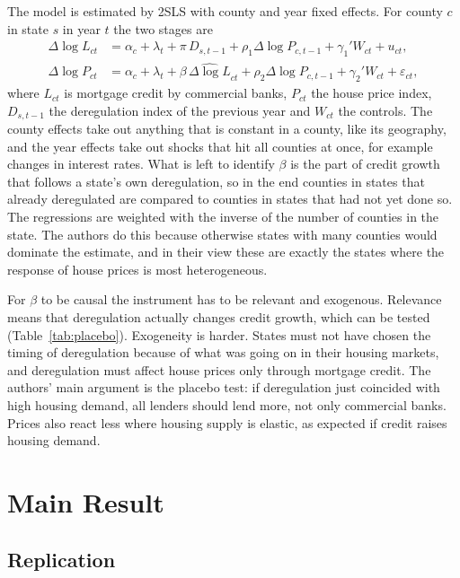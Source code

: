 \documentclass[12pt,a4paper]{article}
\begin{document}
The model is estimated by 2SLS with county and year fixed effects. For county $c$ in state $s$ in year $t$ the two stages are
\begin{align}
  \Delta \log L_{ct} &= \alpha_c + \lambda_t + \pi\, D_{s,t-1} + \rho_1 \Delta \log P_{c,t-1} + \gamma_1' W_{ct} + u_{ct}, \label{eq:fs}\\
  \Delta \log P_{ct} &= \alpha_c + \lambda_t + \beta\, \widehat{\Delta \log L}_{ct} + \rho_2 \Delta \log P_{c,t-1} + \gamma_2' W_{ct} + \varepsilon_{ct}, \label{eq:main}
\end{align}
where $L_{ct}$ is mortgage credit by commercial banks, $P_{ct}$ the house price index, $D_{s,t-1}$ the deregulation index of the previous year and $W_{ct}$ the controls. The county effects take out anything that is constant in a county, like its geography, and the year effects take out shocks that hit all counties at once, for example changes in interest rates. What is left to identify $\beta$ is the part of credit growth that follows a state's own deregulation, so in the end counties in states that already deregulated are compared to counties in states that had not yet done so. The regressions are weighted with the inverse of the number of counties in the state. The authors do this because otherwise states with many counties would dominate the estimate, and in their view these are exactly the states where the response of house prices is most heterogeneous.

For $\beta$ to be causal the instrument has to be relevant and exogenous. Relevance means that deregulation actually changes credit growth, which can be tested (Table~\ref{tab:placebo}). Exogeneity is harder. States must not have chosen the timing of deregulation because of what was going on in their housing markets, and deregulation must affect house prices only through mortgage credit. The authors' main argument is the placebo test: if deregulation just coincided with high housing demand, all lenders should lend more, not only commercial banks. Prices also react less where housing supply is elastic, as expected if credit raises housing demand.

\section{Main Result}

\subsection{Replication}
\end{document}
